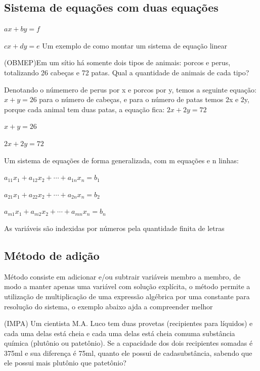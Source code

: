 \begin{multicols*}{2}
             \subsection*{Sistema de equações com duas equações}
             $ax + by = f $
             
            $cx + dy = e$	
            Um exemplo de como montar um sistema de equação linear
            
            (OBMEP)Em um sítio há somente dois tipos de animais: porcos e perus, totalizando 26 cabeças e 			72 patas. Qual a quantidade de animais de cada tipo?
            
            Denotando o númemero de perus por x e porcos por y, temos a seguinte equação: $x + y =26$ para 			o número de cabeças, e para o número de patas temos 2x e 2y, porque cada animal tem duas patas, 		a equação fica: $2x + 2y = 72$
            
            $x+y=26$
            
            $2x+2y = 72$
            
            Um sistema de equações de forma generalizada, com m equações e n linhas:
            
            $a_{11}x_1 + a_{12}x_2 + \cdots + a_{1n}x_n = b_1$
            
            $a_{21}x_1 + a_{22}x_2 + \cdots + a_{2n}x_n = b_2$
            
            $a_{m1}x_1 + a_{m2}x_2 + \cdots + a_{mn}x_n = b_n$
            
            As variáveis são indexidas por números pela quantidade finita de letras
            
            \subsection*{Método de adição}
            Método consiste em adicionar e/ou subtrair variáveis membro a membro, de modo a manter apenas 			uma variável com solução explícita, o método permite a utilização de multiplicação de uma 				expressão algébrica por uma constante para resolução do sistema, o exemplo abaixo ajda a 				compreender melhor		
            
            (IMPA) Um cientista M.A. Luco tem duas provetas (recipientes para líquidos) e cada uma delas 			está cheia e cada uma delas está cheia comuma substância química (plutônio ou patetônio). Se a 			capacidade dos dois recipientes somadas é 375ml e sua diferença é 75ml, quanto ele possui de 			cadasubstância, sabendo que ele possui mais plutônio que patetônio?
            

\end{multicols*}
